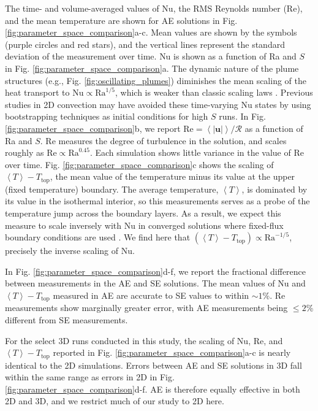 \documentclass[aps, pre, onecolumn, nofootinbib, notitlepage, groupedaddress, amsfonts, amssymb, amsmath, longbibliography]{revtex4-1}
\newcommand{\angles}[1]{\ensuremath{\left\langle #1 \right\rangle}}
\begin{document}
The time- and volume-averaged values of Nu, the RMS
Reynolds number (Re), and the mean temperature 
are shown for AE solutions in Fig. \ref{fig:parameter_space_comparison}a-c.
Mean values are shown by the symbols (purple circles and red stars), and 
the vertical lines represent the standard deviation of the measurement over time.
Nu is shown as a function of Ra and $S$ in Fig. \ref{fig:parameter_space_comparison}a.
The dynamic nature of the plume structures (e.g., Fig. \ref{fig:oscillating_plumes})
diminishes the mean
scaling of the heat transport to $\text{Nu} \propto \text{Ra}^{1/5}$,
which is weaker than classic scaling laws \cite{johnston&doering2009, ahlers&all2009}.
Previous studies in 2D convection may have avoided these time-varying Nu states by using
bootstrapping techniques as initial conditions for high $S$ runs.
In Fig. \ref{fig:parameter_space_comparison}b, we report 
$\text{Re} = \angles{|\bm{u}|} / \mathcal{R}$ as a function of Ra and $S$.  
Re measures the degree of
turbulence in the solution, and scales roughly as
$\text{Re} \propto \text{Ra}^{0.45}$. Each simulation shows little variance in
the value of Re over time.
Fig. \ref{fig:parameter_space_comparison}c shows the scaling of $\angles{T} - T_{\text{top}}$,
the mean value of the temperature minus its value at the upper (fixed temperature) boundary.
The average temperature, $\angles{T}$, is dominated by its value in the isothermal interior,
so this measurements serves as a probe of the temperature jump across the boundary
layers. As a result, we expect this measure to
scale inversely with Nu in converged solutions
where fixed-flux boundary conditions are used \cite{otero&all2002}.  We find here
that $(\angles{T} - T_{\text{top}}) \propto \text{Ra}^{-1/5}$, precisely the inverse
scaling of Nu.



In Fig. \ref{fig:parameter_space_comparison}d-f, we report the fractional difference
between measurements in the AE and SE solutions.
The mean values of Nu and $\angles{T} - T_{\text{top}}$ 
measured in AE are accurate to SE values to within $\sim 1$\%.
Re measurements show marginally greater error, with AE measurements being 
$\leq 2$\% different from SE measurements.

For the select 3D runs conducted in this study, the scaling of Nu, Re, and $\angles{T} - T_{\text{top}}$
reported in Fig. \ref{fig:parameter_space_comparison}a-c is nearly identical to the
2D simulations. Errors between AE and SE solutions in 3D fall within the same range as
errors in 2D in Fig. \ref{fig:parameter_space_comparison}d-f. AE is therefore
equally effective in both 2D and 3D, and we restrict much of our study to 2D here.
\end{document}
